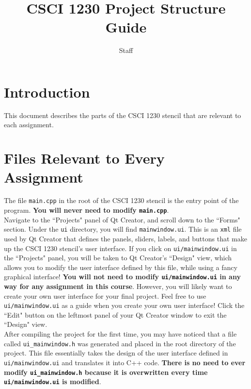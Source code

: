 \documentclass[landscape,twocolumn,letterpaper]{article}
\title{CSCI 1230 Project Structure Guide}
\author{Staff}
\begin{document}
\maketitle

\section{Introduction}

This document describes the parts of the CSCI 1230 stencil that are relevant to each assignment.

\section{Files Relevant to Every Assignment}

The file \texttt{main.cpp} in the root of the CSCI 1230 stencil is the entry point of the program. \textbf{You will never need to modify \texttt{main.cpp}}.\\

\noindent
Navigate to the ``Projects" panel of Qt Creator, and scroll down to the ``Forms" section. Under the \texttt{ui} directory, you will find \texttt{mainwindow.ui}. This is an \texttt{xml} file used by Qt Creator that defines the panels, sliders, labels, and buttons that make up the CSCI 1230 stencil's user interface. If you click on \texttt{ui/mainwindow.ui} in the ``Projects" panel, you will be taken to Qt Creator's ``Design" view, which allows you to modify the user interface defined by this file, while using a fancy graphical interface! \textbf{You will not need to modify \texttt{ui/mainwindow.ui} in any way for any assignment in this course}. However, you will likely want to create your own user interface for your final project. Feel free to use \texttt{ui/mainwindow.ui} as a guide when you create your own user interface! Click the ``Edit" button on the leftmost panel of your Qt Creator window to exit the ``Design" view.\\

\noindent
After compiling the project for the first time, you may have noticed that a file called \texttt{ui\_mainwindow.h} was generated and placed in the root directory of the project. This file essentially takes the design of the user interface defined in \texttt{ui/mainwindow.ui} and translates it into C++ code. \textbf{There is no need to ever modify \texttt{ui\_mainwindow.h} because it is overwritten every time \texttt{ui/mainwindow.ui} is modified}.\\
\end{document}
